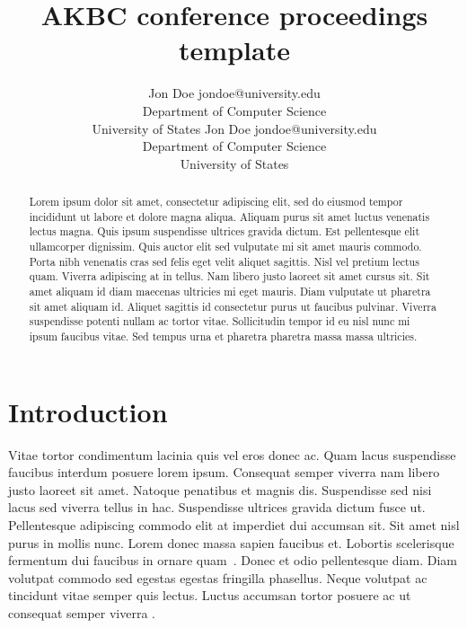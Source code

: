 \documentclass[akbc,twoside,11pt,lettersize]{article}
\begin{document}
\title{AKBC conference proceedings template}

\author{\name Jon Doe \email jondoe@university.edu \\
       \addr Department of Computer Science\\
       University of States
       \AND
       \name Jon Doe \email jondoe@university.edu \\
       \addr Department of Computer Science\\
       University of States}


\maketitle


\begin{abstract}
Lorem ipsum dolor sit amet, consectetur adipiscing elit, sed do eiusmod tempor incididunt ut labore et dolore magna aliqua. Aliquam purus sit amet luctus venenatis lectus magna. Quis ipsum suspendisse ultrices gravida dictum. Est pellentesque elit ullamcorper dignissim. Quis auctor elit sed vulputate mi sit amet mauris commodo. Porta nibh venenatis cras sed felis eget velit aliquet sagittis. Nisl vel pretium lectus quam. Viverra adipiscing at in tellus. Nam libero justo laoreet sit amet cursus sit. Sit amet aliquam id diam maecenas ultricies mi eget mauris. Diam vulputate ut pharetra sit amet aliquam id. Aliquet sagittis id consectetur purus ut faucibus pulvinar. Viverra suspendisse potenti nullam ac tortor vitae. Sollicitudin tempor id eu nisl nunc mi ipsum faucibus vitae. Sed tempus urna et pharetra pharetra massa massa ultricies.
\end{abstract}

\section{Introduction}
\label{Introduction}

Vitae tortor condimentum lacinia quis vel eros donec ac. Quam lacus suspendisse faucibus interdum posuere lorem ipsum. Consequat semper viverra nam libero justo laoreet sit amet. Natoque penatibus et magnis dis. Suspendisse sed nisi lacus sed viverra tellus in hac. Suspendisse ultrices gravida dictum fusce ut. Pellentesque adipiscing commodo elit at imperdiet dui accumsan sit. Sit amet nisl purus in mollis nunc. Lorem donec massa sapien faucibus et. Lobortis scelerisque fermentum dui faucibus in ornare quam~\cite{papad}. Donec et odio pellentesque diam. Diam volutpat commodo sed egestas egestas fringilla phasellus. Neque \cite{min-aaai} volutpat ac tincidunt vitae semper quis lectus. Luctus accumsan tortor posuere ac ut consequat semper viverra \cite{simmons-aaai88,hacker}.
\end{document}
